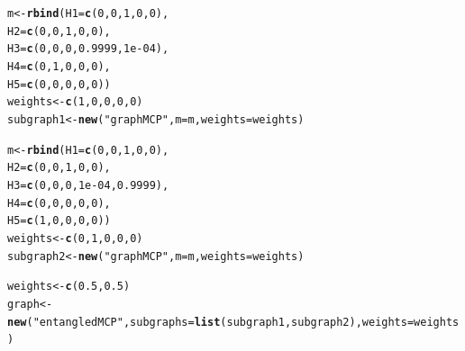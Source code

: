 \documentclass[a4paper, 10pt]{article}\usepackage[]{graphicx}\usepackage[]{color}
\makeatletter
\newcommand{\hlnum}[1]{\textcolor[rgb]{0.686,0.059,0.569}{#1}}%
\newcommand{\hlstr}[1]{\textcolor[rgb]{0.192,0.494,0.8}{#1}}%
\newcommand{\hlstd}[1]{\textcolor[rgb]{0.345,0.345,0.345}{#1}}%
\newcommand{\hlkwb}[1]{\textcolor[rgb]{0.69,0.353,0.396}{#1}}%
\newcommand{\hlkwc}[1]{\textcolor[rgb]{0.333,0.667,0.333}{#1}}%
\newcommand{\hlkwd}[1]{\textcolor[rgb]{0.737,0.353,0.396}{\textbf{#1}}}%
\newenvironment{kframe}{%
 \def\at@end@of@kframe{}%
 \ifinner\ifhmode%
  \def\at@end@of@kframe{\end{minipage}}%
  \begin{minipage}{\columnwidth}%
 \fi\fi%
 \def\FrameCommand##1{\hskip\@totalleftmargin \hskip-\fboxsep
 \colorbox{shadecolor}{##1}\hskip-\fboxsep
     \hskip-\linewidth \hskip-\@totalleftmargin \hskip\columnwidth}%
 \MakeFramed {\advance\hsize-\width
   \@totalleftmargin\z@ \linewidth\hsize
   \@setminipage}}%
 {\par\unskip\endMakeFramed%
 \at@end@of@kframe}
\newenvironment{knitrout}{}{} %
\numberwithin{equation}{section}
\theoremstyle{definition}
\theoremstyle{plain}
\makeatother
\begin{document}
\begin{knitrout}\footnotesize
{}\color{fgcolor}\begin{kframe}
\begin{alltt}
\hlstd{m} \hlkwb{<-} \hlkwd{rbind}\hlstd{(}\hlkwc{H1}\hlstd{=}\hlkwd{c}\hlstd{(}\hlnum{0}\hlstd{,} \hlnum{0}\hlstd{,} \hlnum{1}\hlstd{,} \hlnum{0}\hlstd{,} \hlnum{0}\hlstd{),}
           \hlkwc{H2}\hlstd{=}\hlkwd{c}\hlstd{(}\hlnum{0}\hlstd{,} \hlnum{0}\hlstd{,} \hlnum{1}\hlstd{,} \hlnum{0}\hlstd{,} \hlnum{0}\hlstd{),}
           \hlkwc{H3}\hlstd{=}\hlkwd{c}\hlstd{(}\hlnum{0}\hlstd{,} \hlnum{0}\hlstd{,} \hlnum{0}\hlstd{,} \hlnum{0.9999}\hlstd{,} \hlnum{1e-04}\hlstd{),}
           \hlkwc{H4}\hlstd{=}\hlkwd{c}\hlstd{(}\hlnum{0}\hlstd{,} \hlnum{1}\hlstd{,} \hlnum{0}\hlstd{,} \hlnum{0}\hlstd{,} \hlnum{0}\hlstd{),}
           \hlkwc{H5}\hlstd{=}\hlkwd{c}\hlstd{(}\hlnum{0}\hlstd{,} \hlnum{0}\hlstd{,} \hlnum{0}\hlstd{,} \hlnum{0}\hlstd{,} \hlnum{0}\hlstd{))}
\hlstd{weights} \hlkwb{<-} \hlkwd{c}\hlstd{(}\hlnum{1}\hlstd{,} \hlnum{0}\hlstd{,} \hlnum{0}\hlstd{,} \hlnum{0}\hlstd{,} \hlnum{0}\hlstd{)}
\hlstd{subgraph1} \hlkwb{<-} \hlkwd{new}\hlstd{(}\hlstr{"graphMCP"}\hlstd{,} \hlkwc{m}\hlstd{=m,} \hlkwc{weights}\hlstd{=weights)}

\hlstd{m} \hlkwb{<-} \hlkwd{rbind}\hlstd{(}\hlkwc{H1}\hlstd{=}\hlkwd{c}\hlstd{(}\hlnum{0}\hlstd{,} \hlnum{0}\hlstd{,} \hlnum{1}\hlstd{,} \hlnum{0}\hlstd{,} \hlnum{0}\hlstd{),}
           \hlkwc{H2}\hlstd{=}\hlkwd{c}\hlstd{(}\hlnum{0}\hlstd{,} \hlnum{0}\hlstd{,} \hlnum{1}\hlstd{,} \hlnum{0}\hlstd{,} \hlnum{0}\hlstd{),}
           \hlkwc{H3}\hlstd{=}\hlkwd{c}\hlstd{(}\hlnum{0}\hlstd{,} \hlnum{0}\hlstd{,} \hlnum{0}\hlstd{,} \hlnum{1e-04}\hlstd{,} \hlnum{0.9999}\hlstd{),}
           \hlkwc{H4}\hlstd{=}\hlkwd{c}\hlstd{(}\hlnum{0}\hlstd{,} \hlnum{0}\hlstd{,} \hlnum{0}\hlstd{,} \hlnum{0}\hlstd{,} \hlnum{0}\hlstd{),}
           \hlkwc{H5}\hlstd{=}\hlkwd{c}\hlstd{(}\hlnum{1}\hlstd{,} \hlnum{0}\hlstd{,} \hlnum{0}\hlstd{,} \hlnum{0}\hlstd{,} \hlnum{0}\hlstd{))}
\hlstd{weights} \hlkwb{<-} \hlkwd{c}\hlstd{(}\hlnum{0}\hlstd{,} \hlnum{1}\hlstd{,} \hlnum{0}\hlstd{,} \hlnum{0}\hlstd{,} \hlnum{0}\hlstd{)}
\hlstd{subgraph2} \hlkwb{<-} \hlkwd{new}\hlstd{(}\hlstr{"graphMCP"}\hlstd{,} \hlkwc{m}\hlstd{=m,} \hlkwc{weights}\hlstd{=weights)}

\hlstd{weights} \hlkwb{<-} \hlkwd{c}\hlstd{(}\hlnum{0.5}\hlstd{,} \hlnum{0.5}\hlstd{)}
\hlstd{graph} \hlkwb{<-} \hlkwd{new}\hlstd{(}\hlstr{"entangledMCP"}\hlstd{,} \hlkwc{subgraphs}\hlstd{=}\hlkwd{list}\hlstd{(subgraph1, subgraph2),} \hlkwc{weights}\hlstd{=weights)}
\end{alltt}
\end{kframe}
\end{knitrout}
\end{document}
